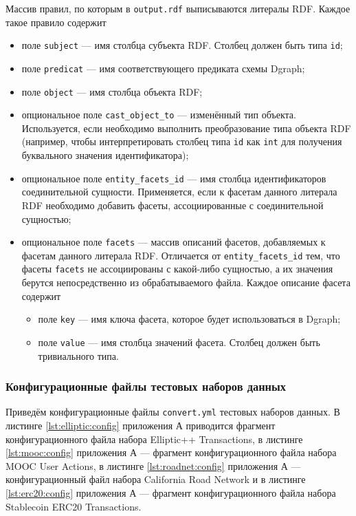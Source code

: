 Массив правил, по которым в \texttt{output.rdf} выписываются литералы RDF. Каждое такое правило содержит
\begin{itemize}
  \item поле \texttt{subject} --- имя столбца субъекта RDF. Столбец должен быть типа \texttt{id};
  \item поле \texttt{predicat} --- имя соответствующего предиката схемы Dgraph;
  \item поле \texttt{object} --- имя столбца объекта RDF;
  \item опциональное поле \texttt{cast\_object\_to} --- изменённый тип объекта. Используется, если необходимо
    выполнить преобразование типа объекта RDF (например, чтобы интерпретировать столбец типа \texttt{id} как
    \texttt{int} для получения буквального значения идентификатора);
  \item опциональное поле \texttt{entity\_facets\_id} --- имя столбца идентификаторов соединительной сущности.
    Применяется, если к фасетам данного литерала RDF необходимо добавить фасеты, ассоциированные с соединительной
    сущностью;
  \item опциональное поле \texttt{facets} --- массив описаний фасетов, добавляемых к фасетам данного литерала RDF.
    Отличается от \texttt{entity\_facets\_id} тем, что фасеты \texttt{facets} не ассоциированы с какой-либо сущностью, а
    их значения берутся непосредственно из обрабатываемого файла. Каждое описание фасета содержит
    \begin{itemize}
      \item поле \texttt{key} --- имя ключа фасета, которое будет использоваться в Dgraph;
      \item поле \texttt{value} --- имя столбца значений фасета. Столбец должен быть тривиального типа.
    \end{itemize}
\end{itemize}

\subsubsection{Конфигурационные файлы тестовых наборов данных}

Приведём конфигурационные файлы \texttt{convert.yml} тестовых наборов данных. В листинге \ref{lst:elliptic:config}
приложения А приводится фрагмент конфигурационного файла набора Elliptic++ Transactions, в листинге
\ref{lst:mooc:config} приложения А --- фрагмент конфигурационного файла набора MOOC User Actions, в листинге
\ref{lst:roadnet:config} приложения А --- конфигурационный файл набора California Road Network и в листинге
\ref{lst:erc20:config} приложения А --- фрагмент конфигурационного файла набора Stablecoin ERC20 Transactions.

